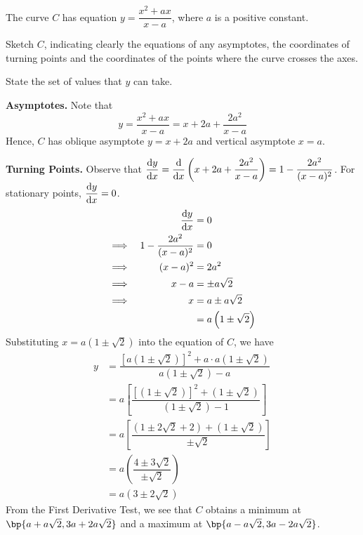 \documentclass{echw}
\begin{document}

    \problem{}
        The curve $C$ has equation $y = \dfrac{x^2 + ax}{x - a}$, where $a$ is a positive constant.

        \medskip

         Sketch $C$, indicating clearly the equations of any asymptotes, the coordinates of turning points and the coordinates of the points where the curve crosses the axes.

        \medskip

         State the set of values that $y$ can take.

    \solution
        \textbf{Asymptotes.} Note that
        \begin{equation*}
            y = \dfrac{x^2 + ax}{x-a} = x + 2a + \dfrac{2a^2}{x-a}
        \end{equation*}
        Hence, $C$ has oblique asymptote $y = x + 2a$ and vertical asymptote $x = a$.

        \medskip

         \textbf{Turning Points.} Observe that $\dfrac{\mathrm{d} y}{\mathrm{d} x} = \dfrac{\mathrm{d} }{\mathrm{d} x} \left(x + 2a + \dfrac{2a^2}{x-a}\right) = 1 - \dfrac{2a^2}{(x-a)^2}$. For stationary points, $\dfrac{\mathrm{d} y}{\mathrm{d} x} = 0$.
        \begin{alignat*}{2}
            &&\dfrac{\mathrm{d} y}{\mathrm{d} x} &= 0\\
            \implies&&1 - \dfrac{2a^2}{(x-a)^2} &= 0\\
            \implies&&(x-a)^2 &= 2a^2\\
            \implies&&x-a &= \pm a\sqrt2\\
            \implies&&x &= a \pm a\sqrt2\\
            && &= a\left(1 \pm \sqrt2\right)
        \end{alignat*}
        Substituting $x = a\left(1 \pm \sqrt2\right)$ into the equation of $C$, we have
        \begin{align*}
            y &= \dfrac{\left[a\left(1 \pm \sqrt2\right)\right]^2 + a\cdot a\left(1 \pm \sqrt2\right)}{a\left(1 \pm \sqrt2\right) - a}\\
            &= a \left[\dfrac{\left[\left(1 \pm \sqrt2\right)\right]^2 + \left(1 \pm \sqrt2\right)}{\left(1 \pm \sqrt2\right) - 1}\right]\\
            &= a \left[\dfrac{\left(1 \pm 2\sqrt2 + 2\right) + \left(1 \pm \sqrt2\right)}{\pm \sqrt2}\right]\\
            &= a \left(\dfrac{4 \pm 3\sqrt2}{\pm \sqrt2}\right)\\
            &= a\left(3 \pm 2\sqrt2\right)
        \end{align*}
        From the First Derivative Test, we see that $C$ obtains a minimum at $\bp{a + a\sqrt2, 3a + 2a\sqrt2}$ and a maximum at $\bp{a - a\sqrt2, 3a - 2a\sqrt2}$. 
\end{document}
